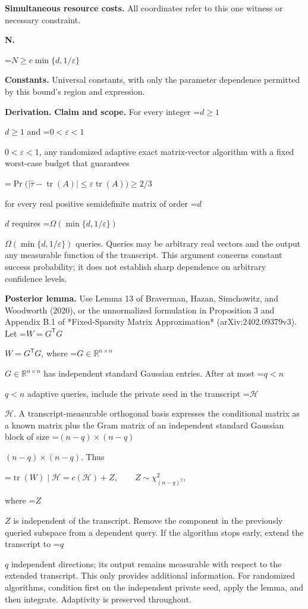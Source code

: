 \documentclass[10pt,a4paper]{article}
\newcommand{\AtlasMath}[1]{\par\begingroup\centering\setbox0=\hbox{$\displaystyle #1$}\ifdim\wd0>1.4\linewidth\typeout{ATLAS WIDE FORMULA: \the\wd0}\fi\ifdim\wd0>\linewidth\resizebox{\linewidth}{!}{\box0}\else\box0\fi\par\endgroup}
\newcommand{\AtlasInlineMath}[1]{\begingroup\setbox0=\hbox{$#1$}\ifdim\wd0>.4\linewidth\endgroup\AtlasMath{#1}\else\endgroup$#1$\fi}
\begin{document}
\textbf{Simultaneous resource costs.} All coordinates refer to this one witness or necessary constraint.

\textbf{N.}

\AtlasMath{N\ge c\min\{d,1/\varepsilon\}}
\textbf{Constants.} Universal constants, with only the parameter dependence permitted by this bound’s region and expression.

\textbf{Derivation.} \textbf{Claim and scope.} For every integer \AtlasInlineMath{d\ge1} and \AtlasInlineMath{0<\varepsilon<1}, any randomized adaptive exact matrix-vector algorithm with a fixed worst-case budget that guarantees

\AtlasMath{\Pr\bigl(|\widehat\tau-\operatorname{tr}(A)|\le\varepsilon\operatorname{tr}(A)\bigr)\ge2/3}

for every real positive semidefinite matrix of order \AtlasInlineMath{d} requires \AtlasInlineMath{\Omega(\min\{d,1/\varepsilon\})} queries. Queries may be arbitrary real vectors and the output any measurable function of the transcript. This argument concerns constant success probability; it does not establish sharp dependence on arbitrary confidence levels.

\textbf{Posterior lemma.} Use Lemma 13 of Braverman, Hazan, Simchowitz, and Woodworth (2020), or the unnormalized formulation in Proposition 3 and Appendix B.1 of *Fixed-Sparsity Matrix Approximation* (arXiv:2402.09379v3). Let \AtlasInlineMath{W=G^{\mathsf T}G}, where \AtlasInlineMath{G\in\mathbb R^{n\times n}} has independent standard Gaussian entries. After at most \AtlasInlineMath{q<n} adaptive queries, include the private seed in the transcript \AtlasInlineMath{\mathcal H}. A transcript-measurable orthogonal basis expresses the conditional matrix as a known matrix plus the Gram matrix of an independent standard Gaussian block of size \AtlasInlineMath{(n-q)\times(n-q)}. Thus

\AtlasMath{\operatorname{tr}(W)\mid\mathcal H=c(\mathcal H)+Z,\qquad Z\sim\chi^2_{(n-q)^2},}

where \AtlasInlineMath{Z} is independent of the transcript. Remove the component in the previously queried subspace from a dependent query. If the algorithm stops early, extend the transcript to \AtlasInlineMath{q} independent directions; its output remains measurable with respect to the extended transcript. This only provides additional information. For randomized algorithms, condition first on the independent private seed, apply the lemma, and then integrate. Adaptivity is preserved throughout.
\end{document}
